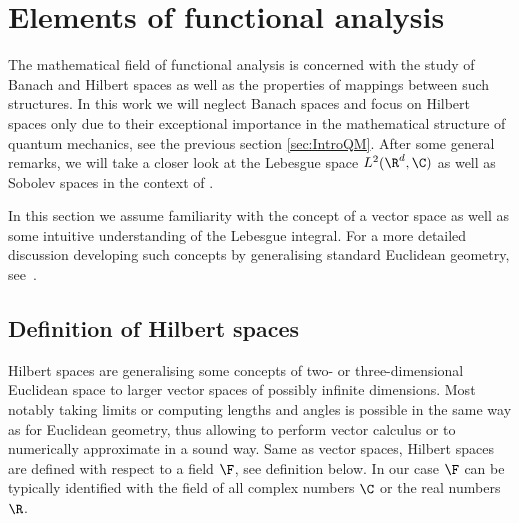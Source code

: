\section{Elements of functional analysis}
\label{sec:FunAna}

The mathematical field of functional analysis
is concerned with the study of Banach and Hilbert spaces
as well as the properties of mappings between such structures.
In this work we will neglect Banach spaces
and focus on Hilbert spaces only
due to their exceptional importance in the mathematical structure
of quantum mechanics, see the previous section \ref{sec:IntroQM}.
After some general remarks, we will take a closer look
at the Lebesgue space $L^2(\R^d, \C)$
as well as Sobolev spaces in the context of \QM.

In this section we assume familiarity with the concept of a vector space
as well as some intuitive understanding of the Lebesgue integral.
For a more detailed discussion developing such concepts
by generalising standard Euclidean geometry,
see~\cite{DiracNotation}.

\subsection{Definition of Hilbert spaces}
\label{sec:Hilbert}

Hilbert spaces are generalising some concepts of
two- or three-dimensional Euclidean space to
larger vector spaces of possibly infinite dimensions.
Most notably taking limits or computing lengths and angles
is possible in the same way as for Euclidean geometry,
thus allowing to perform vector calculus or
to numerically approximate in a sound way.
Same as vector spaces, Hilbert spaces are defined with respect
to a field $\F$, see definition below.
In our case $\F$ can be typically identified
with the field of all complex numbers $\C$ or the real numbers $\R$.

